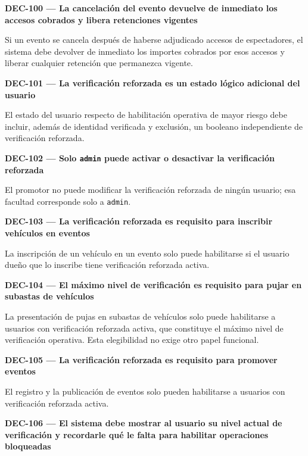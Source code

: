 \documentclass[10pt,letterpaper]{article}
\begin{document}
\noindent\textbf{DEC-100 --- La cancelación del evento devuelve de inmediato los accesos cobrados y libera retenciones vigentes}\par
Si un evento se cancela después de haberse adjudicado accesos de espectadores, el sistema debe devolver de inmediato los importes cobrados por esos accesos y liberar cualquier retención que permanezca vigente.\par\vspace{0.45em}
\noindent\textbf{DEC-101 --- La verificación reforzada es un estado lógico adicional del usuario}\par
El estado del usuario respecto de habilitación operativa de mayor riesgo debe incluir, además de identidad verificada y exclusión, un booleano independiente de verificación reforzada.\par\vspace{0.45em}
\noindent\textbf{DEC-102 --- Solo \texttt{admin} puede activar o desactivar la verificación reforzada}\par
El promotor no puede modificar la verificación reforzada de ningún usuario; esa facultad corresponde solo a \texttt{admin}.\par\vspace{0.45em}
\noindent\textbf{DEC-103 --- La verificación reforzada es requisito para inscribir vehículos en eventos}\par
La inscripción de un vehículo en un evento solo puede habilitarse si el usuario dueño que lo inscribe tiene verificación reforzada activa.\par\vspace{0.45em}
\noindent\textbf{DEC-104 --- El máximo nivel de verificación es requisito para pujar en subastas de vehículos}\par
La presentación de pujas en subastas de vehículos solo puede habilitarse a usuarios con verificación reforzada activa, que constituye el máximo nivel de verificación operativa. Esta elegibilidad no exige otro papel funcional.\par\vspace{0.45em}
\noindent\textbf{DEC-105 --- La verificación reforzada es requisito para promover eventos}\par
El registro y la publicación de eventos solo pueden habilitarse a usuarios con verificación reforzada activa.\par\vspace{0.45em}
\noindent\textbf{DEC-106 --- El sistema debe mostrar al usuario su nivel actual de verificación y recordarle qué le falta para habilitar operaciones bloqueadas}\par
\end{document}
